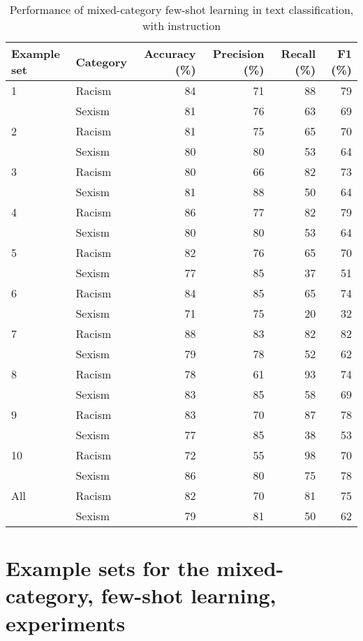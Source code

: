 \documentclass{bmcart}
\begin{document}
\begin{backmatter}
\begin{table}
\caption{\label{tab:fewshotmixedinstruct-summary}Performance of mixed-category few-shot learning in text classification, with instruction}
\centering
\begin{tabular}[t]{llrrrr}
\hline
Example set & Category & Accuracy (\%) & Precision (\%) & Recall (\%) & F1 (\%)\\
\hline
1 & Racism & 84 & 71 & 88 & 79\\
 & Sexism & 81 & 76 & 63 & 69\\
\hline
2 & Racism & 81 & 75 & 65 & 70\\
 & Sexism & 80 & 80 & 53 & \vphantom{1} 64\\
\hline
3 & Racism & 80 & 66 & 82 & 73\\
 & Sexism & 81 & 88 & 50 & 64\\
\hline
4 & Racism & 86 & 77 & 82 & 79\\
 & Sexism & 80 & 80 & 53 & 64\\
\hline
5 & Racism & 82 & 76 & 65 & 70\\
 & Sexism & 77 & 85 & 37 & 51\\
\hline
6 & Racism & 84 & 85 & 65 & 74\\
 & Sexism & 71 & 75 & 20 & 32\\
\hline
7 & Racism & 88 & 83 & 82 & 82\\
 & Sexism & 79 & 78 & 52 & 62\\
\hline
8 & Racism & 78 & 61 & 93 & 74\\
 & Sexism & 83 & 85 & 58 & 69\\
\hline
9 & Racism & 83 & 70 & 87 & 78\\
 & Sexism & 77 & 85 & 38 & 53\\
\hline
10 & Racism & 72 & 55 & 98 & 70\\
 & Sexism & 86 & 80 & 75 & 78\\
\hline
All & Racism & 82 & 70 & 81 & 75\\
 & Sexism & 79 & 81 & 50 & 62\\
\hline
\end{tabular}
\end{table}




\appendix


\section{Example sets for the mixed-category, few-shot learning, experiments}\label{appendxa}


\end{backmatter}
\end{document}
